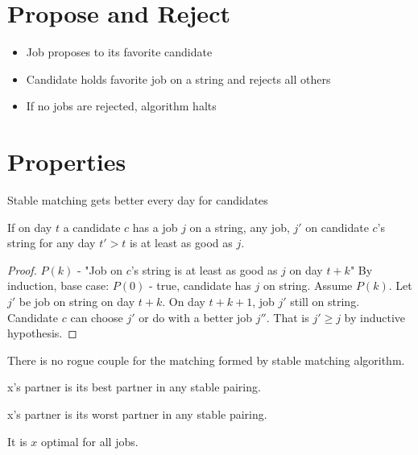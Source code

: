 
\section{Propose and Reject}
\begin{itemize}
  \item Job proposes to its favorite candidate
  \item Candidate holds favorite job on a string and rejects all others
  \item If no jobs are rejected, algorithm halts
\end{itemize}

\section{Properties}
Stable matching gets better every day for candidates

\begin{lemma}
  If on day $t$ a candidate $c$ has a job $j$ on a string, any job, $j'$ on
  candidate $c$'s string for any day $t'>t$ is at least as good as $j$.
\end{lemma}

\begin{proof}
  $P(k)$ - "Job on $c$'s string is at least as good as $j$ on day $t+k$"
  By induction, base case: $P(0)$ - true, candidate has $j$ on string.
  Assume $P(k)$. Let $j'$ be job on string on day $t+k$.
  On day $t + k + 1$, job $j'$ still on string. Candidate $c$ can choose $j'$
  or do with a better job $j''$. That is $j' \ge j$ by inductive hypothesis.
\end{proof}

\begin{lemma}
  There is no rogue couple for the matching formed by stable matching algorithm.
\end{lemma}

\begin{definition}
  x's partner is its best partner in any stable pairing.
\end{definition}

\begin{definition}
  x's partner is its worst partner in any stable pairing.
\end{definition}

\begin{definition}
  It is $x$ optimal for all jobs.
\end{definition}
